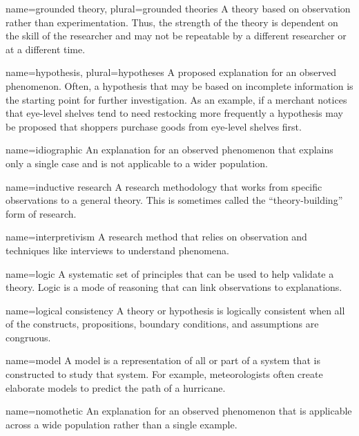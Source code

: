 {name={grounded theory},
	plural={grounded theories}}
{%
	A theory based on observation rather than experimentation. Thus, the strength of the theory is dependent on the skill of the researcher and may not be repeatable by a different researcher or at a different time.
}

{name={hypothesis},
	plural={hypotheses}}
{%
	A proposed explanation for an observed phenomenon. Often, a hypothesis that may be based on incomplete information is the starting point for further investigation. As an example, if a merchant notices that eye-level shelves tend to need restocking more frequently a hypothesis may be proposed that shoppers purchase goods from eye-level shelves first. 
}


{name={idiographic}}
{%
	An explanation for an observed phenomenon that explains only a single case and is not applicable to a wider population.
}

{name={inductive research}}
{%
	A research methodology that works from specific observations to a general theory. This is sometimes called the ``theory-building'' form of research.
}

{name={interpretivism}}
{%
	A research method that relies on observation and techniques like interviews to understand phenomena. 
}


{name={logic}}
{%
	A systematic set of principles that can be used to help validate a theory. Logic is a mode of reasoning that can link observations to explanations.
}

{name={logical consistency}}
{%
	A theory or hypothesis is logically consistent when all of the constructs, propositions, boundary conditions, and assumptions are congruous.
}

{name={model}}
{%
	A model is a representation of all or part of a system that is constructed to study that system. For example, meteorologists often create elaborate models to predict 	the path of a hurricane. 
}

{name={nomothetic}}
{%
	An explanation for an observed phenomenon that is applicable across a wide population rather than a single example.
}

